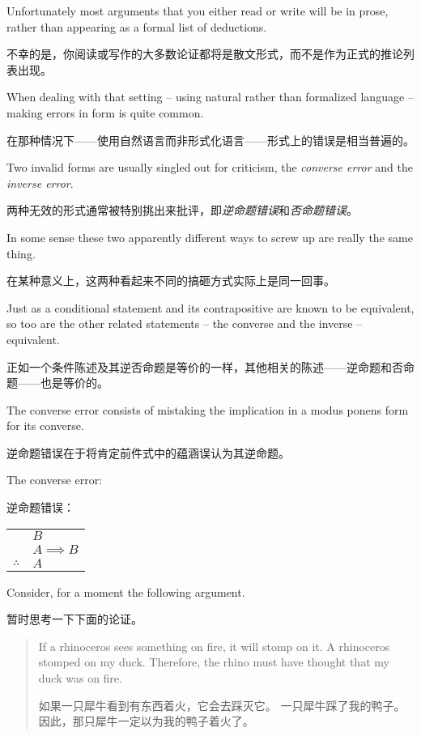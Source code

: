 Unfortunately most arguments that you either read or write
will be in prose, rather than appearing as a formal list of deductions.

不幸的是，你阅读或写作的大多数论证都将是散文形式，而不是作为正式的推论列表出现。

When dealing with that setting -- using natural rather than formalized 
language -- making errors in form is quite common.

在那种情况下——使用自然语言而非形式化语言——形式上的错误是相当普遍的。

Two invalid forms are usually singled out for criticism, the 
\emph{converse error} and the 
\emph{inverse error}.

两种无效的形式通常被特别挑出来批评，即\emph{逆命题错误}和\emph{否命题错误}。

In some sense 
these two apparently different ways to screw up are really the same thing.

在某种意义上，这两种看起来不同的搞砸方式实际上是同一回事。

Just as a conditional statement and its contrapositive are known to be 
equivalent, so too are the other related statements -- the
converse and the inverse -- equivalent.

正如一个条件陈述及其逆否命题是等价的一样，其他相关的陈述——逆命题和否命题——也是等价的。

The converse error consists of 
mistaking the implication in a modus ponens form for its converse.

逆命题错误在于将肯定前件式中的蕴涵误认为其逆命题。

The converse error:

逆命题错误：

\begin{center}
\begin{tabular}{cl}
 & $B$ \\
 & $A \implies B$ \\ \hline
$\therefore$ & $A$ \\
\end{tabular}
\end{center}
   
Consider, for a moment the following argument.

暂时思考一下下面的论证。
\begin{quote}
If a rhinoceros sees something on fire, it will stomp on it. \newline
A rhinoceros stomped on my duck. \newline
Therefore, the rhino must have thought that my duck was on fire.

如果一只犀牛看到有东西着火，它会去踩灭它。\newline
一只犀牛踩了我的鸭子。\newline
因此，那只犀牛一定以为我的鸭子着火了。
\end{quote} 

